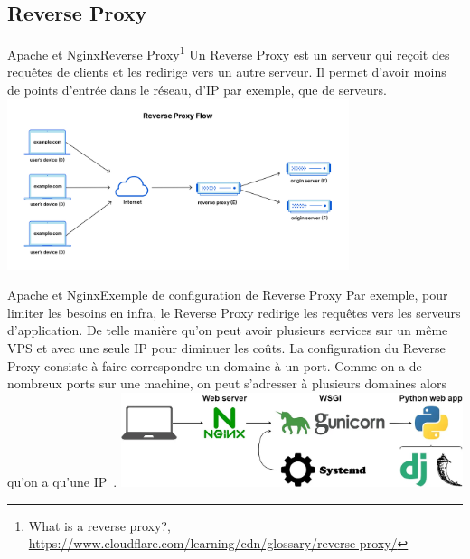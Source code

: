 \documentclass{beamer}
\begin{document}
    \subsection{Reverse Proxy}\label{subsec:reverse-proxy}

    \begin{frame}{Apache et Nginx}{Reverse Proxy\footnote{What is a reverse proxy?, \url{https://www.cloudflare.com/learning/cdn/glossary/reverse-proxy/}}}
        Un Reverse Proxy est un serveur qui reçoit des requêtes de clients et les redirige vers un autre serveur.
        Il permet d'avoir moins de points d'entrée dans le réseau, d'IP par exemple, que de serveurs.
        \bigbreak
        \centering
        \includegraphics[width=10cm]{image/reverse-proxy-flow}
    \end{frame}

    \begin{frame}{Apache et Nginx}{Exemple de configuration de Reverse Proxy}
        Par exemple, pour limiter les besoins en infra, le Reverse Proxy redirige les requêtes vers les serveurs d'application.
        De telle manière qu'on peut avoir plusieurs services sur un même VPS et avec une seule IP pour diminuer les coûts.
        \bigbreak
        La configuration du Reverse Proxy consiste à faire correspondre un domaine à un port.
        Comme on a de nombreux ports sur une machine, on peut s'adresser à plusieurs domaines alors qu'on a qu'une IP~.
        \bigbreak
        \centering
        \includegraphics[width=10cm]{image/flask-gunicorn-nginx}
    \end{frame}
\end{document}
